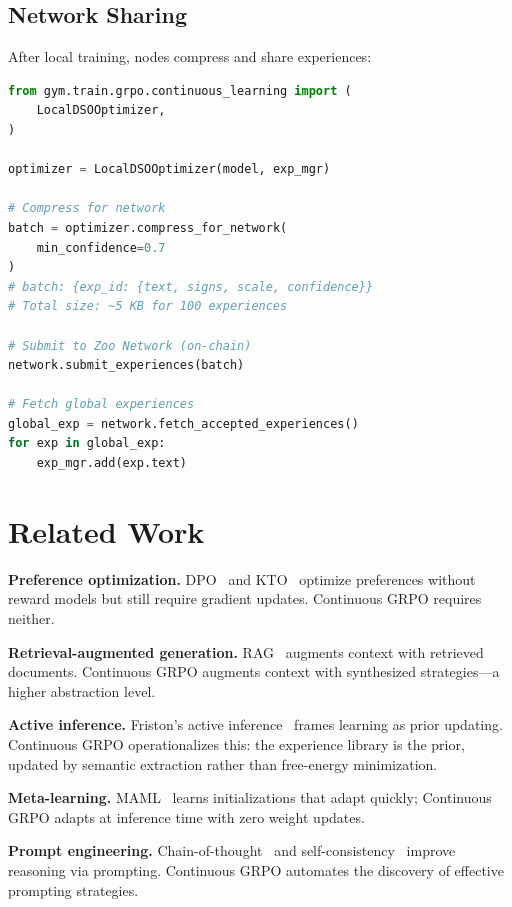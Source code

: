 \documentclass[11pt,letterpaper]{article}
\begin{document}
\subsection{Network Sharing}

After local training, nodes compress and share experiences:

\begin{lstlisting}[language=python,caption=Federated experience sharing]
from gym.train.grpo.continuous_learning import (
    LocalDSOOptimizer,
)

optimizer = LocalDSOOptimizer(model, exp_mgr)

# Compress for network
batch = optimizer.compress_for_network(
    min_confidence=0.7
)
# batch: {exp_id: {text, signs, scale, confidence}}
# Total size: ~5 KB for 100 experiences

# Submit to Zoo Network (on-chain)
network.submit_experiences(batch)

# Fetch global experiences
global_exp = network.fetch_accepted_experiences()
for exp in global_exp:
    exp_mgr.add(exp.text)
\end{lstlisting}

\section{Related Work}
\label{sec:related}

\textbf{Preference optimization.}  DPO~\cite{rafailov2023dpo} and KTO~\cite{ethayarajh2024kto} optimize preferences without reward models but still require gradient updates.  Continuous GRPO requires neither.

\textbf{Retrieval-augmented generation.}  RAG~\cite{lewis2020retrieval} augments context with retrieved documents.  Continuous GRPO augments context with synthesized strategies---a higher abstraction level.

\textbf{Active inference.}  Friston's active inference~\cite{friston2017active} frames learning as prior updating.  Continuous GRPO operationalizes this: the experience library is the prior, updated by semantic extraction rather than free-energy minimization.

\textbf{Meta-learning.}  MAML~\cite{finn2017model} learns initializations that adapt quickly; Continuous GRPO adapts at inference time with zero weight updates.

\textbf{Prompt engineering.}  Chain-of-thought~\cite{wei2022chain} and self-consistency~\cite{wang2022self} improve reasoning via prompting.  Continuous GRPO automates the discovery of effective prompting strategies.
\end{document}
